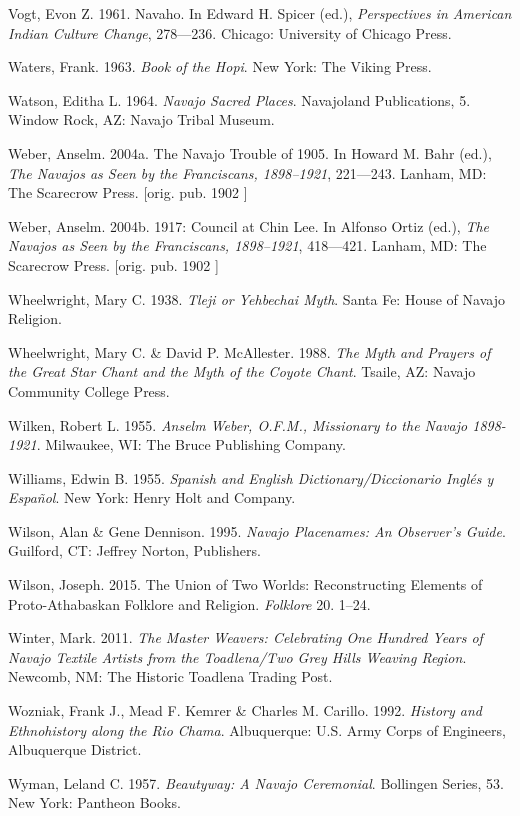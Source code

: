 Vogt, Evon Z.  1961.  Navaho. In Edward H. Spicer (ed.),  \textit{Perspectives in American Indian Culture Change}, 278---236.  Chicago:  University of Chicago Press.

Waters, Frank. 1963.  \textit{Book of the Hopi}.  New York:  The Viking Press.

Watson, Editha L. 1964.  \textit{Navajo Sacred Places}.  Navajoland Publications, 5.  Window Rock, AZ:  Navajo Tribal Museum.

Weber, Anselm. 2004a.  The Navajo Trouble of 1905.  In Howard M. Bahr (ed.), \textit{The Navajos as Seen by the Franciscans, 1898--1921}, 221---243.  Lanham, MD:  The Scarecrow Press.  [orig. pub. 1902 ]

Weber, Anselm. 2004b.  1917: Council at Chin Lee. In Alfonso Ortiz (ed.), \textit{The Navajos as Seen by the Franciscans, 1898--1921}, 418---421.  Lanham, MD:  The Scarecrow Press.  [orig. pub. 1902 ]

Wheelwright, Mary C.  1938.  \textit{Tleji or Yehbechai Myth}.  Santa Fe:  House of Navajo Religion.

Wheelwright, Mary C. \& David P. McAllester. 1988. \textit{The Myth and Prayers of the Great Star Chant and the Myth of the Coyote Chant}.  Tsaile, AZ:  Navajo Community College Press.

Wilken, Robert L. 1955.  \textit{Anselm Weber, O.F.M., Missionary to the Navajo 1898-1921}.  Milwaukee, WI:  The Bruce Publishing Company.

Williams, Edwin B. 1955.  \textit{Spanish and English Dictionary/Diccionario Inglés y Español}.  New York:  Henry Holt and Company.

Wilson, Alan \& Gene Dennison. 1995.  \textit{Navajo Placenames: An Observer’s Guide}.  Guilford, CT:  Jeffrey Norton, Publishers.

Wilson, Joseph. 2015. The Union of Two Worlds: Reconstructing Elements of Proto-Athabaskan Folklore and Religion.  \textit{Folklore} 20. 1--24.

Winter, Mark. 2011. \textit{The Master Weavers: Celebrating One Hundred Years of Navajo Textile Artists from the Toadlena/Two Grey Hills Weaving Region}.  Newcomb, NM:  The Historic Toadlena Trading Post.

Wozniak, Frank J., Mead F. Kemrer \& Charles M. Carillo. 1992.  \textit{History and Ethnohistory along the Rio Chama}.  Albuquerque:  U.S. Army Corps of Engineers, Albuquerque District.



Wyman, Leland C. 1957.  \textit{Beautyway: A Navajo Ceremonial}.  Bollingen Series, 53.  New York:  Pantheon Books.

